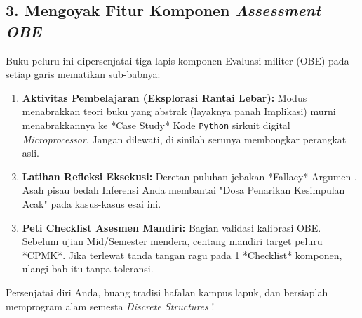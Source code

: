 \subsection{3. Mengoyak Fitur Komponen \textit{Assessment OBE}}

Buku peluru ini dipersenjatai tiga lapis komponen Evaluasi militer (OBE) pada setiap garis mematikan sub-babnya:
\begin{enumerate}
    \item \textbf{Aktivitas Pembelajaran (Eksplorasi Rantai Lebar):} Modus menabrakkan teori buku yang abstrak (layaknya panah Implikasi) murni menabrakkannya ke *Case Study* Kode \texttt{Python} sirkuit digital \textit{Microprocessor}. Jangan dilewati, di sinilah serunya membongkar perangkat asli.
    \item \textbf{Latihan Refleksi Eksekusi:} Deretan puluhan jebakan *Fallacy* Argumen \cite{copi2014}. Asah pisau bedah Inferensi Anda membantai "Dosa Penarikan Kesimpulan Acak" pada kasus-kasus esai ini.
    \item \textbf{Peti Checklist Asesmen Mandiri:} Bagian validasi kalibrasi OBE. Sebelum ujian Mid/Semester mendera, centang mandiri target peluru *CPMK*. Jika terlewat tanda tangan ragu pada 1 *Checklist* komponen, ulangi bab itu tanpa toleransi. 
\end{enumerate}

Persenjatai diri Anda, buang tradisi hafalan kampus lapuk, dan bersiaplah memprogram alam semesta \textit{Discrete Structures} \cite{levin_discrete,stanford_cs103}!
